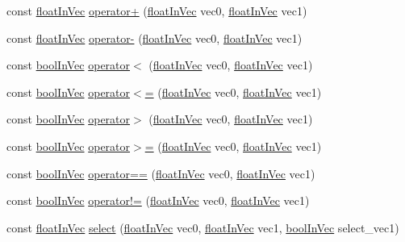 \begin{DoxyCompactItemize}
\item 
const \hyperlink{classVectormath_1_1floatInVec}{float\-In\-Vec} \hyperlink{namespaceVectormath_a977e01f00ee56098ae0aeb5a5c77e534}{operator+} (\hyperlink{classVectormath_1_1floatInVec}{float\-In\-Vec} vec0, \hyperlink{classVectormath_1_1floatInVec}{float\-In\-Vec} vec1)
\item 
const \hyperlink{classVectormath_1_1floatInVec}{float\-In\-Vec} \hyperlink{namespaceVectormath_a4bdd5b97a604c47f88c1f6dea58877e3}{operator-\/} (\hyperlink{classVectormath_1_1floatInVec}{float\-In\-Vec} vec0, \hyperlink{classVectormath_1_1floatInVec}{float\-In\-Vec} vec1)
\item 
const \hyperlink{classVectormath_1_1boolInVec}{bool\-In\-Vec} \hyperlink{namespaceVectormath_a60186bf5a7f5e56dd5bf17f742dd4e80}{operator$<$} (\hyperlink{classVectormath_1_1floatInVec}{float\-In\-Vec} vec0, \hyperlink{classVectormath_1_1floatInVec}{float\-In\-Vec} vec1)
\item 
const \hyperlink{classVectormath_1_1boolInVec}{bool\-In\-Vec} \hyperlink{namespaceVectormath_a353837520d203ffbb5e2929ba813f752}{operator$<$=} (\hyperlink{classVectormath_1_1floatInVec}{float\-In\-Vec} vec0, \hyperlink{classVectormath_1_1floatInVec}{float\-In\-Vec} vec1)
\item 
const \hyperlink{classVectormath_1_1boolInVec}{bool\-In\-Vec} \hyperlink{namespaceVectormath_a9386940558da04f086cdcd661640e414}{operator$>$} (\hyperlink{classVectormath_1_1floatInVec}{float\-In\-Vec} vec0, \hyperlink{classVectormath_1_1floatInVec}{float\-In\-Vec} vec1)
\item 
const \hyperlink{classVectormath_1_1boolInVec}{bool\-In\-Vec} \hyperlink{namespaceVectormath_ad0e659de095767b9b4b37baacf9e444e}{operator$>$=} (\hyperlink{classVectormath_1_1floatInVec}{float\-In\-Vec} vec0, \hyperlink{classVectormath_1_1floatInVec}{float\-In\-Vec} vec1)
\item 
const \hyperlink{classVectormath_1_1boolInVec}{bool\-In\-Vec} \hyperlink{namespaceVectormath_a536877f6933b64b8960df839a7446eca}{operator==} (\hyperlink{classVectormath_1_1floatInVec}{float\-In\-Vec} vec0, \hyperlink{classVectormath_1_1floatInVec}{float\-In\-Vec} vec1)
\item 
const \hyperlink{classVectormath_1_1boolInVec}{bool\-In\-Vec} \hyperlink{namespaceVectormath_ac87dcdc5fdac47a9718b3d85ef2643cf}{operator!=} (\hyperlink{classVectormath_1_1floatInVec}{float\-In\-Vec} vec0, \hyperlink{classVectormath_1_1floatInVec}{float\-In\-Vec} vec1)
\item 
const \hyperlink{classVectormath_1_1floatInVec}{float\-In\-Vec} \hyperlink{namespaceVectormath_ae6b014fe6f613c69720294226a8aecfd}{select} (\hyperlink{classVectormath_1_1floatInVec}{float\-In\-Vec} vec0, \hyperlink{classVectormath_1_1floatInVec}{float\-In\-Vec} vec1, \hyperlink{classVectormath_1_1boolInVec}{bool\-In\-Vec} select\-\_\-vec1)
\end{DoxyCompactItemize}



